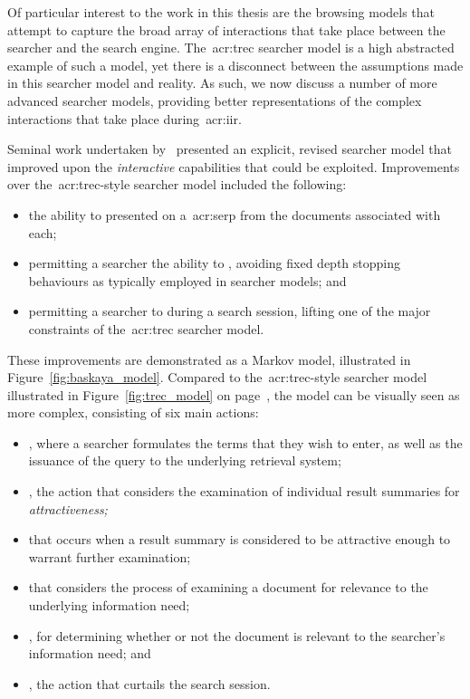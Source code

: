 Of particular interest to the work in this thesis are the browsing models that attempt to capture the broad array of interactions that take place between the searcher and the search engine. The~\gls{acr:trec} searcher model is a high abstracted example of such a model, yet there is a disconnect between the assumptions made in this searcher model and reality. As such, we now discuss a number of more advanced searcher models, providing better representations of the complex interactions that take place during~\gls{acr:iir}.

Seminal work undertaken by~\cite{baskaya2013behavioural_factors} presented an explicit, revised searcher model that improved upon the \emph{interactive} capabilities that could be exploited. Improvements over the~\gls{acr:trec}-style searcher model included the following:

\begin{itemize}
    \item{the ability to  presented on a~\gls{acr:serp} from the documents associated with each;}
    \item{permitting a searcher the ability to , avoiding fixed depth stopping behaviours as typically employed in searcher models; and}
    \item{permitting a searcher to  during a search session, lifting one of the major constraints of the~\gls{acr:trec} searcher model.}
\end{itemize}

These improvements are demonstrated as a Markov model, illustrated in Figure~\ref{fig:baskaya_model}. Compared to the~\gls{acr:trec}-style searcher model illustrated in Figure~\ref{fig:trec_model} on page~\pageref{fig:trec_model}, the model can be visually seen as more complex, consisting of six main actions:

\begin{itemize}
    \item{, where a searcher formulates the terms that they wish to enter, as well as the issuance of the query to the underlying retrieval system;}
    \item{, the action that considers the examination of individual result summaries for \emph{attractiveness;}}
    \item{ that occurs when a result summary is considered to be attractive enough to warrant further examination;}
    \item{ that considers the process of examining a document for relevance to the underlying information need;}
    \item{, for determining whether or not the document is relevant to the searcher's information need; and}
    \item{, the action that curtails the search session.}
\end{itemize}

